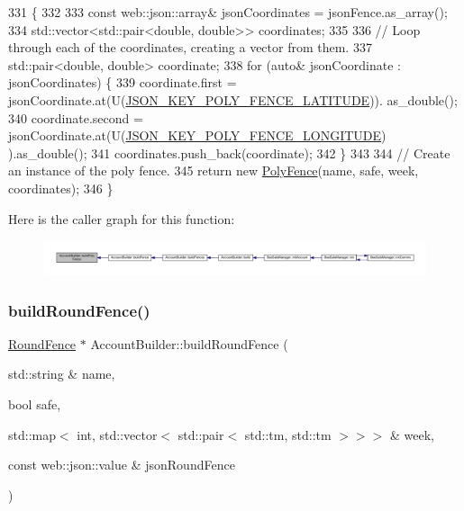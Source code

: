 \begin{DoxyCode}
331 \{
332 
333     \textcolor{keyword}{const} web::json::array& jsonCoordinates = jsonFence.as\_array();
334     std::vector<std::pair<double, double>> coordinates;
335 
336     \textcolor{comment}{// Loop through each of the coordinates, creating a vector from them.}
337     std::pair<double, double> coordinate;
338     \textcolor{keywordflow}{for} (\textcolor{keyword}{auto}& jsonCoordinate : jsonCoordinates) \{
339         coordinate.first = jsonCoordinate.at(U(\hyperlink{_poly_fence_8h_a9a8bf08118a4bda10ed5efe8cf534024}{JSON\_KEY\_POLY\_FENCE\_LATITUDE})).
      as\_double();
340         coordinate.second = jsonCoordinate.at(U(\hyperlink{_poly_fence_8h_a7411c3395f017461cb1bf07687ee4ef3}{JSON\_KEY\_POLY\_FENCE\_LONGITUDE})
      ).as\_double();
341         coordinates.push\_back(coordinate);
342     \}
343 
344     \textcolor{comment}{// Create an instance of the poly fence.}
345     \textcolor{keywordflow}{return} \textcolor{keyword}{new} \hyperlink{class_poly_fence}{PolyFence}(name, safe, week, coordinates);
346 \}
\end{DoxyCode}
Here is the caller graph for this function\+:\nopagebreak
\begin{figure}[H]
\begin{center}
\leavevmode
\includegraphics[width=350pt]{d9/daa/class_account_builder_a9a93946d8ba8908f6bcfa6b793cc6277_icgraph}
\end{center}
\end{figure}
\mbox{\label{class_account_builder_a0223a0830ba9a0e707c5a2bd5d74ee50}} 
\subsubsection{\texorpdfstring{build\+Round\+Fence()}{buildRoundFence()}}
{\footnotesize\ttfamily \hyperlink{class_round_fence}{Round\+Fence} $\ast$ Account\+Builder\+::build\+Round\+Fence (\begin{DoxyParamCaption}\item[{std\+::string \&}]{name,  }\item[{bool}]{safe,  }\item[{std\+::map$<$ int, std\+::vector$<$ std\+::pair$<$ std\+::tm, std\+::tm $>$$>$$>$ \&}]{week,  }\item[{const web\+::json\+::value \&}]{json\+Round\+Fence }\end{DoxyParamCaption})\hspace{0.3cm}{\ttfamily [private]}}

